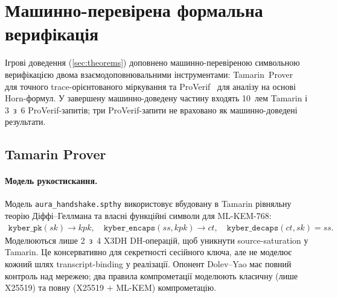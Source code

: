 \documentclass[11pt,a4paper]{article}
\theoremstyle{definition}
\begin{document}
\section{Машинно-перевірена формальна верифікація}\label{sec:formal}

Ігрові доведення (\cref{sec:theorems}) доповнено машинно-перевіреною
символьною верифікацією двома взаємодоповнювальними
інструментами: Tamarin~Prover~\cite{meier2013} для точного
trace-орієнтованого міркування та ProVerif~\cite{blanchet2016} для
аналізу на основі Horn-формул. У завершену машинно-доведену частину
входять 10~лем Tamarin і 3~з~6 ProVerif-запитів; три ProVerif-запити
не враховано як машинно-доведені результати.

\subsection{Tamarin Prover}\label{sec:tamarin}

\paragraph{Модель рукостискання.}
Модель \texttt{aura\_handshake.spthy} використовує вбудовану в
Tamarin рівняльну теорію Діффі--Геллмана та власні функційні
символи для ML-KEM-768:
\begin{align}
  \texttt{kyber\_pk}(sk) \to kpk,\quad
  \texttt{kyber\_encaps}(ss, kpk) \to ct,\quad
  \texttt{kyber\_decaps}(ct, sk) = ss. \label{eq:tamarin-kyber-symbols}
\end{align}
Моделюються лише 2~з~4 X3DH DH-операцій, щоб уникнути source-saturation у
Tamarin. Це консервативно для секретності сесійного ключа, але не моделює
кожний шлях transcript-binding у реалізації. Опонент Dolev--Yao має повний контроль над
мережею; два правила компрометації моделюють класичну (лише X25519)
та повну (X25519 $+$ ML-KEM) компрометацію.
\end{document}
